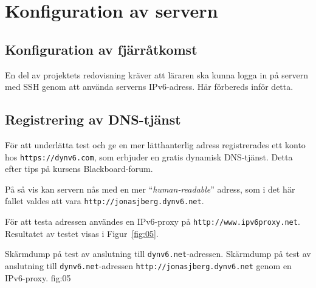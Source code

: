 %
%
%


\section{Konfiguration av servern}
\subsection{Konfiguration av fjärråtkomst}
En del av projektets redovisning kräver att läraren ska kunna logga in på servern
med SSH genom att använda serverns IPv6-adress. Här förbereds inför detta.


\subsection{Registrering av DNS-tjänst}
För att underlätta test och ge en mer lätthanterlig adress registrerades ett
konto hos \texttt{https://dynv6.com}, som erbjuder en gratis dynamisk
DNS-tjänst. Detta efter tips på kursens Blackboard-forum.

På så vis kan servern nås med en mer ``\emph{human-readable}'' adress,
som i det här fallet valdes att vara \texttt{http://jonasjberg.dynv6.net}.

För att testa adressen användes en IPv6-proxy på \texttt{http://www.ipv6proxy.net}.
Resultatet av testet visas i Figur~\ref{fig:05}.

           {Skärmdump på test av anslutning till \texttt{dynv6.net}-adressen.}
           {Skärmdump på test av anslutning till \texttt{dynv6.net}-adressen 
					  \texttt{http://jonasjberg.dynv6.net} genom en IPv6-proxy.}
           {fig:05}


